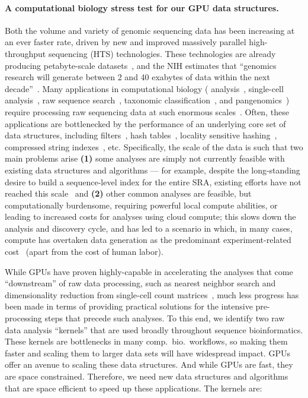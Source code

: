 \paragraph{A computational biology stress test for our GPU data structures.}
Both the volume and variety of genomic sequencing data has been increasing at an ever faster rate, driven by new and improved massively parallel high-throughput sequencing (HTS) technologies.  These technologies are already producing
petabyte-scale datasets~\cite{kodama2012sequence}, and the NIH estimates that ``genomics research will generate between 2 and 40 exabytes of data within the next decade''~\cite{NHGRIDataScience}. Many applications in computational biology (\kmer
analysis~\cite{MarccaisKi11}, single-cell analysis~\cite{he2022alevin}, raw sequence search~\cite{solomon2016fast}, taxonomic classification~\cite{wood2014kraken}, and pangenomics~\cite{computational2018computational})
require processing raw sequencing data at such enormous scales~\cite{kodama2012sequence}. 
%
Often, these applications are bottlenecked by the performance of an underlying core set of data structures, including filters~\cite{PandeyAlBe18, solomon2016fast}, hash tables~\cite{solomon2016fast,almodaresi2022incrementally}, locality sensitive hashing~\cite{Marais2019}, compressed string indexes~\cite{Almodaresi2018Pufferfish}, etc. %
Specifically, the scale of the data is such that two main problems arise \textbf{(1)} some analyses are simply not currently feasible with existing data structures and algorithms --- for example, despite the long-standing desire to build a sequence-level index for the entire SRA, existing efforts have not reached this scale~\cite{Karasikov2020, HarrisM20, SolomonK17, almodaresi2022incrementally, AlmodaresiPFJP20,PandeyAlBe18} and \textbf{(2)} other common analyses are feasible, but computationally burdensome, requiring powerful local compute abilities, or leading to increased costs for analyses using cloud compute; this slows down the analysis and discovery cycle, and has led to a scenario in which, in many cases, compute has overtaken data generation as the predominant experiment-related cost~\cite{Muir_2016} (apart from the cost of human labor). 

While GPUs have proven highly-capable in accelerating the analyses that come ``downstream'' of raw data processing, such as nearest neighbor search and dimensionality reduction from single-cell count matrices~\cite{RAPIDS:2022}, much less progress has been made in terms of providing practical solutions for the intensive pre-processing steps that precede such analyses.  To this end, we identify two raw data analysis ``kernels'' that are used broadly throughout sequence bioinformatics. These kernels are bottlenecks in many comp.~bio.~workflows, so making them faster and scaling them to larger data sets will have widespread impact. GPUs offer an avenue to scaling these data structures.  And while  GPUs are fast, they are space constrained.  Therefore, we need new data structures and algorithms that are space efficient to speed up these applications.  
%
The kernels are:

